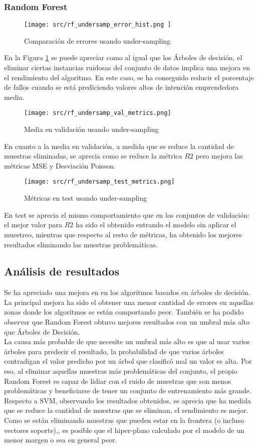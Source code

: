 \subsubsection*{Random Forest}
\begin{figure}[H]
	\centering
	\texttt{[image: src/rf\_undersamp\_error\_hist.png ]}
	\caption{Comparación de errores usando under-sampling}
	\label{fig:cmp_error_rf}
\end{figure}
En la Figura \ref{fig:cmp_error_rf} se puede apreciar como al igual que los Árboles de decisión, el eliminar ciertas instancias ruidosas del conjunto de datos implica una mejora en el rendimiento del algoritmo. En este caso, se ha conseguido reducir el porcentaje de fallos cuando se está prediciendo valores altos de intención emprendedora media.
\begin{figure}[H]
	\centering
	\texttt{[image: src/rf\_undersamp\_val\_metrics.png]}
	\caption{Media en validación usando under-sampling}
	\label{fig:cmp_val_rf}
\end{figure}
En cuanto a la media en validación, a medida que se reduce la cantidad de muestras eliminadas, se aprecia como se reduce la métrica $R2$ pero mejora las métricas MSE y Desviación Poisson.
\begin{figure}[H]
	\centering
	\texttt{[image: src/rf\_undersamp\_test\_metrics.png]}
	\caption{Métricas en test usando under-sampling}
	\label{fig:cmp_test_rf}
\end{figure}
En test se aprecia el mismo comportamiento que en los conjuntos de validación: el mejor valor para $R2$ ha sido el obtenido entrando el modelo sin aplicar el  muestreo, mientras que respecto al resto de métricas, ha obtenido los mejores resultados eliminando las muestras problemáticas.\\
\subsection{Análisis de resultados}
Se ha apreciado una mejora en en los algoritmos basados en árboles de decisión. La principal mejora ha sido el obtener una menor cantidad de errores en aquellas zonas donde los algoritmos se están comportando peor. También se ha podido observar que Random Forest obtuvo mejores resultados con un umbral más alto que Árboles de Decisión. \\
La causa más probable de que necesite un umbral más alto es que al usar varios árboles para predecir el resultado, la probabilidad de que varios árboles contradigan el valor predicho por un árbol que clasificó mal un valor es alta. Por eso, al eliminar aquellas muestras más problemáticas del conjunto, el propio Random Forest es capaz de lidiar con el ruido de muestras que son menos problemáticas y beneficiarse de tener un conjunto de entrenamiento más grande.\\
\linebreak
Respecto a SVM, observando los resultados obtenidos, se aprecia que ha medida que se reduce la cantidad de muestras que se eliminan, el rendimiento es mejor.
Como se están eliminando muestras que pueden estar en la frontera (o incluso vectores soporte),, es posible que el hiper-plano calculado por el modelo de un menor margen o sea en general peor.
